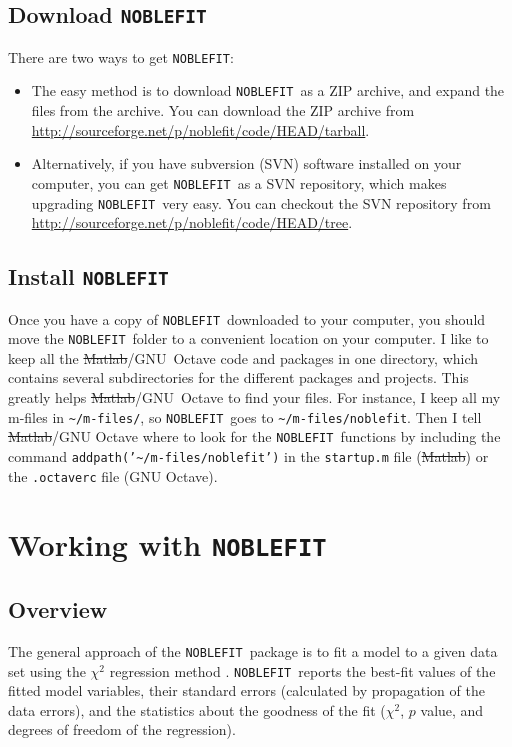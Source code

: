 \documentclass[12pt]{article}
\newcommand{\noblefit}{{\tt NOBLEFIT}}
\newcommand{\secref}[1]{Sec.~\ref{sec:#1}}
\begin{document}
\subsection{Download \noblefit}\label{sec:get_mpic}
There are two ways to get \noblefit: 
\begin{itemize}
	\item The easy method is to download \noblefit\ as a ZIP archive, and expand the files from the archive. You can download the ZIP archive from \url{http://sourceforge.net/p/noblefit/code/HEAD/tarball}.
	\item Alternatively, if you have subversion (SVN) software installed on your computer, you can get \noblefit\ as a SVN repository, which makes upgrading \noblefit\ very easy. You can checkout the SVN repository from \url{http://sourceforge.net/p/noblefit/code/HEAD/tree}.
\end{itemize}

\subsection{Install \noblefit}\label{sec:install_mpic}
Once you have a copy of \noblefit\ downloaded to your computer, you should move the \noblefit\ folder to a convenient location on your computer. I like to keep all the \sout{Matlab}/\mbox{GNU Octave} code and packages in one directory, which contains several subdirectories for the different packages and projects. This greatly helps \sout{Matlab}/\mbox{GNU Octave} to find your files. For instance, I keep all my m-files in {\tt \textasciitilde{}/m-files/}, so \noblefit\ goes to {\tt \textasciitilde{}/m-files/noblefit}. Then I tell \sout{Matlab}/GNU Octave where to look for the \noblefit\ functions by including the command {\tt addpath('\textasciitilde{}/m-files/noblefit')} in the {\tt startup.m} file (\sout{Matlab}) or the {\tt .octaverc} file (GNU Octave).

\section{Working with \noblefit}

\subsection{Overview}
The general approach of the \noblefit\ package is to fit a model to a given data set using the $\chi^2$ regression method \citep{Press:1986}. \noblefit\ reports the best-fit values of the fitted model variables, their standard errors (calculated by propagation of the data errors), and the statistics about the goodness of the fit ($\chi^2$, $p$ value, and degrees of freedom of the regression).\par
\end{document}
